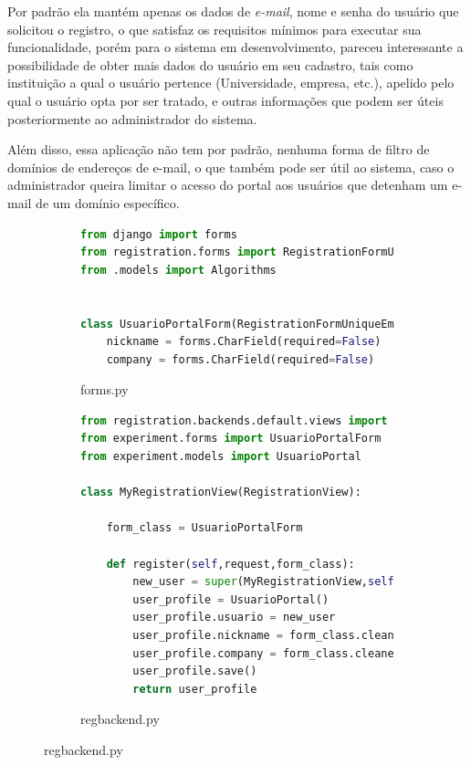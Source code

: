 \documentclass[tg]{mdtufsm}
\begin{document}
Por padrão ela mantém apenas os dados de \emph{e-mail}, nome e senha do usuário que solicitou o registro, o que satisfaz os requisitos mínimos para executar sua funcionalidade, porém para o sistema em desenvolvimento, pareceu interessante a possibilidade de obter mais dados do usuário em seu cadastro, tais como instituição a qual o usuário pertence (Universidade, empresa, etc.), apelido pelo qual o usuário opta por ser tratado, e outras informações que podem ser úteis posteriormente ao administrador do sistema.

Além disso, essa aplicação não tem por padrão, nenhuma forma de filtro de domínios de endereços de e-mail, o que também pode ser útil ao sistema, caso o administrador queira limitar o acesso do portal aos usuários que detenham um e-mail de um domínio específico.
\begin{figure}
	\centering
	\begin{subfigure}[c]{1\textwidth}
		\begin{lstlisting}[language=Python, frame=single]
from django import forms
from registration.forms import RegistrationFormUniqueEmail
from .models import Algorithms


class UsuarioPortalForm(RegistrationFormUniqueEmail):
	nickname = forms.CharField(required=False)
	company = forms.CharField(required=False)
	\end{lstlisting}
		
		\caption{forms.py}
		\label{fig:formRegister}
	\end{subfigure}
	
	\begin{subfigure}[c]{1\textwidth}
		\begin{lstlisting}[language=Python, frame=single]
from registration.backends.default.views import RegistrationView
from experiment.forms import UsuarioPortalForm
from experiment.models import UsuarioPortal
		
class MyRegistrationView(RegistrationView):
	
	form_class = UsuarioPortalForm
	
	def register(self,request,form_class):
		new_user = super(MyRegistrationView,self).register(request, form_class)
		user_profile = UsuarioPortal()
		user_profile.usuario = new_user
		user_profile.nickname = form_class.cleaned_data['nickname']
		user_profile.company = form_class.cleaned_data['company']
		user_profile.save()
		return user_profile
			\end{lstlisting}
		
		\caption{regbackend.py}
		\label{fig:view}
	\end{subfigure}
\end{figure}
\end{document}
